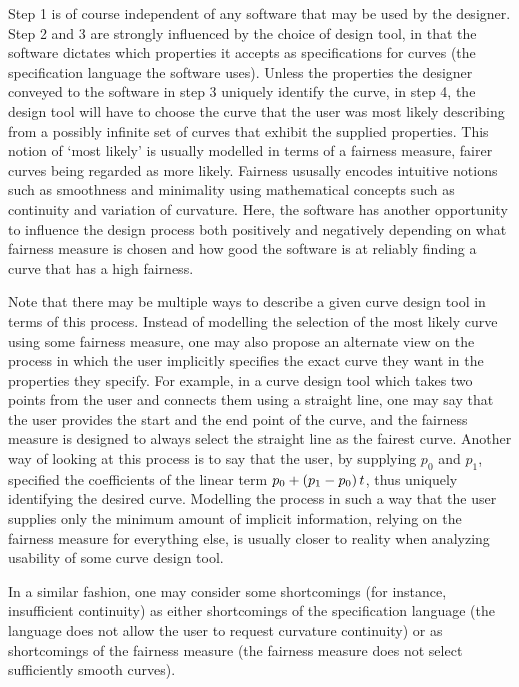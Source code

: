 \documentclass[a4paper]{article}
\begin{document}
			Step 1 is of course independent of any software that may be used by the designer. Step 2 and 3 are strongly influenced by the choice of design tool, in that the software dictates which properties it accepts as specifications for curves (the specification language the software uses). Unless the properties the designer conveyed to the software in step 3 uniquely identify the curve, in step 4, the design tool will have to choose the curve that the user was most likely describing from a possibly infinite set of curves that exhibit the supplied properties. This notion of `most likely' is usually modelled in terms of a fairness measure, fairer curves being regarded as more likely. Fairness ususally encodes intuitive notions such as smoothness and minimality using mathematical concepts such as continuity and variation of curvature. Here, the software has another opportunity to influence the design process both positively and negatively depending on what fairness measure is chosen and how good the software is at reliably finding a curve that has a high fairness.

			Note that there may be multiple ways to describe a given curve design tool in terms of this process. Instead of modelling the selection of the most likely curve using some fairness measure, one may also propose an alternate view on the process in which the user implicitly specifies the exact curve they want in the properties they specify. For example, in a curve design tool which takes two points from the user and connects them using a straight line, one may say that the user provides the start and the end point of the curve, and the fairness measure is designed to always select the straight line as the fairest curve. Another way of looking at this process is to say that the user, by supplying \(p_0\) and \(p_1\), specified the coefficients of the linear term \(p_0 + \left( p_1 - p_0 \right) t\), thus uniquely identifying the desired curve. Modelling the process in such a way that the user supplies only the minimum amount of implicit information, relying on the fairness measure for everything else, is usually closer to reality when analyzing usability of some curve design tool.

			In a similar fashion, one may consider some shortcomings (for instance, insufficient continuity) as either shortcomings of the specification language (the language does not allow the user to request curvature continuity) or as shortcomings of the fairness measure (the fairness measure does not select sufficiently smooth curves).
\end{document}
